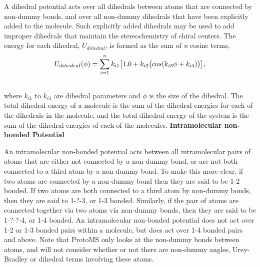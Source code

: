 \documentclass[letterpaper,10pt,english]{manual}
\begin{document}
A dihedral potential acts over all dihedrals between atoms that are connected by non-dummy bonds, and over all non-dummy dihedrals that have been explicitly added to the molecule. Such explicitly added dihedrals may be used to add improper dihedrals that maintain the stereochemistry of chiral centers. The energy for each dihedral, $U_{dihedral}$, is formed as the sum of \emph{n} cosine terms,
\hypertarget{equation-dihepot}{}\begin{gather}
\begin{split}U_{dihedral}(\phi) = \sum_{i=1}^{n} k_{i1}\bigl[1.0 + k_{i2}\bigl(cos(k_{i3}\phi + k_{i4})\bigr)\bigr],\end{split}\label{protoms-dihepot}\\\begin{split}\end{split}\notag
\end{gather}
where $k_{i1}$ to $k_{i4}$ are dihedral parameters and $\phi$ is the size of the dihedral. The total dihedral energy of a molecule is the sum of the dihedral energies for each of the dihedrals in the molecule, and the total dihedral energy of the system is the sum of the dihedral energies of each of the molecules.
\textbf{Intramolecular non-bonded Potential}

An intramolecular non-bonded potential acts between all intramolecular pairs of atoms that are either not connected by a non-dummy bond, or are not both connected to a third atom by a non-dummy bond. To make this more clear, if two atoms are connected by a non-dummy bond then they are said to be 1-2 bonded. If two atoms are both connected to a third atom by non-dummy bonds, then they are said to 1-?-3, or 1-3 bonded. Similarly, if the pair of atoms are connected together via two atoms via non-dummy bonds, then they are said to be 1-?-?-4, or 1-4 bonded. An intramolecular non-bonded potential does not act over 1-2 or 1-3 bonded pairs within a molecule, but does act over 1-4 bonded pairs and above. Note that ProtoMS only looks at the non-dummy bonds between atoms, and will not consider whether or not there are non-dummy angles, Urey-Bradley or dihedral terms involving these atoms.
\end{document}
